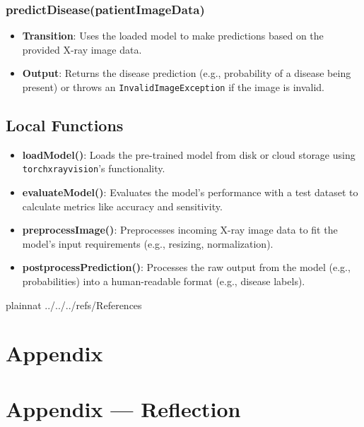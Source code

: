 \documentclass[12pt, titlepage]{article}
\begin{document}
\subsubsection{predictDisease(patientImageData)}
\begin{itemize}
    \item \textbf{Transition}: Uses the loaded model to make predictions based on the provided X-ray image data.
    \item \textbf{Output}: Returns the disease prediction (e.g., probability of a disease being present) or throws an \texttt{InvalidImageException} if the image is invalid.
\end{itemize}

\subsection{Local Functions}
\begin{itemize}
    \item \textbf{loadModel()}: Loads the pre-trained model from disk or cloud storage using \texttt{torchxrayvision}'s functionality.
    \item \textbf{evaluateModel()}: Evaluates the model’s performance with a test dataset to calculate metrics like accuracy and sensitivity.
    \item \textbf{preprocessImage()}: Preprocesses incoming X-ray image data to fit the model's input requirements (e.g., resizing, normalization).
    \item \textbf{postprocessPrediction()}: Processes the raw output from the model (e.g., probabilities) into a human-readable format (e.g., disease labels).
\end{itemize}

 {plainnat}
 {../../../refs/References}

\newpage

\section{Appendix} \label{Appendix}


\newpage{}

\section*{Appendix --- Reflection}

\end{document}
